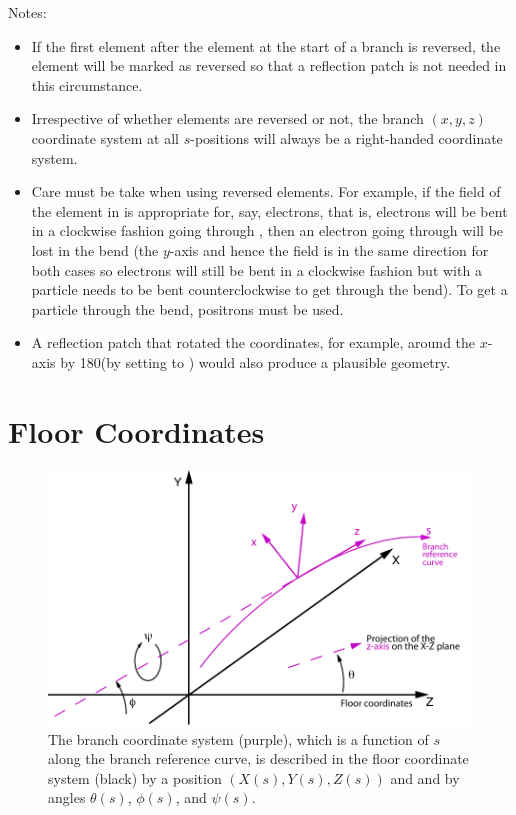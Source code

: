 Notes:
\begin{itemize}
\item
If the first element after the  element at the start of a branch is reversed, the
 element will be marked as reversed so that a reflection patch is not needed in
this circumstance.
\item
Irrespective of whether elements are reversed or not, the branch $(x,y,z)$ coordinate system
at all $s$-positions will always be a right-handed coordinate system.
\item
Care must be take when using reversed elements. For example, if the field of the  element in
 is appropriate for, say, electrons, that is, electrons will be bent in a clockwise
fashion going through , then an electron going through  will be lost in the bend
(the $y$-axis and hence the field is in the same direction for both cases so electrons will still be
bent in a clockwise fashion but with  a particle needs to be bent counterclockwise to get
through the bend). To get a particle through the bend, positrons must be used.
\item
A reflection patch that rotated the coordinates, for example, around the $x$-axis by 180\Deg (by
setting  to ) would also produce a plausible geometry.
\end{itemize}

\section{Floor Coordinates}
\label{s:floor}

\begin{figure}[tb]
  \centering
  \includegraphics{floor-coords.pdf}
  \caption[The Floor Coordinate System]{
The branch coordinate system (purple), which is a function of $s$ along the branch reference
curve, is described in the floor coordinate system (black) by a position $(X(s), Y(s), Z(s))$ and
and by angles $\theta(s)$, $\phi(s)$, and $\psi(s)$.
  }
  \label{f:floor.coords}
\end{figure}

